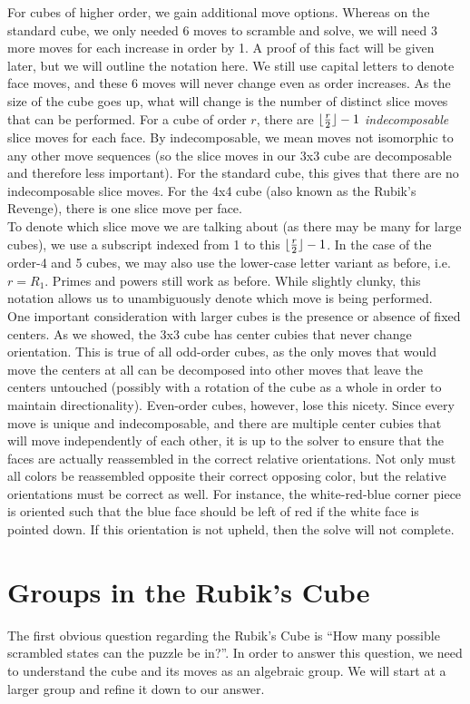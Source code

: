 \documentclass[10pt,letterpaper]{report}
\DeclarePairedDelimiter\floor{\lfloor}{\rfloor}
\begin{document}
For cubes of higher order, we gain additional move options.  Whereas on the standard cube, we only needed 6 moves to scramble and solve, we will need 3 more moves for each increase in order by 1.  A proof of this fact will be given later, but we will outline the notation here.  We still use capital letters to denote face moves, and these 6 moves will never change even as order increases.  As the size of the cube goes up, what will change is the number of distinct slice moves that can be performed.  For a cube of order $r$, there are $\floor{\frac{r}{2}}-1$ \textit{indecomposable} slice moves for each face.  By indecomposable, we mean moves not isomorphic to any other move sequences (so the slice moves in our 3x3 cube are decomposable and therefore less important).  For the standard cube, this gives that there are no indecomposable slice moves.  For the 4x4 cube (also known as the Rubik's Revenge), there is one slice move per face.\\

To denote which slice move we are talking about (as there may be many for large cubes), we use a subscript indexed from 1 to this $\floor{\frac{r}{2}}-1$.  In the case of the order-4 and 5 cubes, we may also use the lower-case letter variant as before, i.e. $r = R_1$.  Primes and powers still work as before.  While slightly clunky, this notation allows us to unambiguously denote which move is being performed. \\

One important consideration with larger cubes is the presence or absence of fixed centers.  As we showed, the 3x3 cube has center cubies that never change orientation.  This is true of all odd-order cubes, as the only moves that would move the centers at all can be decomposed into other moves that leave the centers untouched (possibly with a rotation of the cube as a whole in order to maintain directionality).  Even-order cubes, however, lose this nicety.  Since every move is unique and indecomposable, and there are multiple center cubies that will move independently of each other, it is up to the solver to ensure that the faces are actually reassembled in the correct relative orientations.  Not only must all colors be reassembled opposite their correct opposing color, but the relative orientations must be correct as well.  For instance, the white-red-blue corner piece is oriented such that the blue face should be left of red if the white face is pointed down.  If this orientation is not upheld, then the solve will not complete.
\chapter{Groups in the Rubik's Cube}
The first obvious question regarding the Rubik's Cube is ``How many possible scrambled states can the puzzle be in?''.  In order to answer this question, we need to understand the cube and its moves as an algebraic group.  We will start at a larger group and refine it down to our answer.
\end{document}
